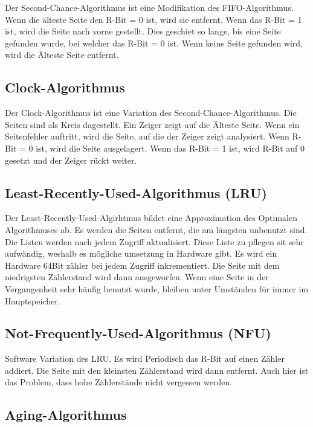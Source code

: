 Der Second-Chance-Algorithmus ist eine Modifikation des FIFO-Algorithmus. Wenn die älteste Seite den R-Bit = 0 ist, wird sie entfernt. Wenn das R-Bit = 1 ist, wird die Seite nach vorne gestellt. Dies geschiet so lange, bis eine Seite gefunden wurde, bei welcher das R-Bit = 0 ist. Wenn keine Seite gefunden wird, wird die Älteste Seite entfernt.

\subsection{Clock-Algorithmus}

Der Clock-Algorithmus ist eine Variation des Second-Chance-Algorithmus. Die Seiten sind als Kreis dagestellt. Ein Zeiger zeigt auf die Älteste Seite. Wenn ein Seitenfehler auftritt, wird die Seite, auf die der Zeiger zeigt analysiert. Wenn R-Bit = 0 ist, wird die Seite ausgelagert. Wenn das R-Bit = 1 ist, wird R-Bit auf 0 gesetzt und der Zeiger rückt weiter.

\subsection{Least-Recently-Used-Algorithmus (LRU)}

Der Least-Recently-Used-Algirhtmus bildet eine Approximation des Optimalen Algorithmuses ab. Es werden die Seiten entfernt, die am längsten unbenutzt sind. Die Listen werden nach jedem Zugriff aktualisiert. Diese Liste zu pflegen sit sehr aufwändig, weshalb es mögliche umsetzung in Hardware gibt. Es wird ein Hardware 64Bit zähler bei jedem Zugriff inkrementiert. Die Seite mit dem niedrigsten Zählerstand wird dann ausgeworfen. Wenn eine Seite in der Vergangenheit sehr häufig benutzt wurde, bleiben unter Umständen für immer im Hauptspeicher.

\subsection{Not-Frequently-Used-Algorithmus (NFU)}

Software Variation des LRU. Es wird Periodisch das R-Bit auf einen Zähler addiert. Die Seite mit den kleinsten Zählerstand wird dann entfernt. Auch hier ist das Problem, dass hohe Zählerstände nicht vergessen werden.

\subsection{Aging-Algorithmus}


